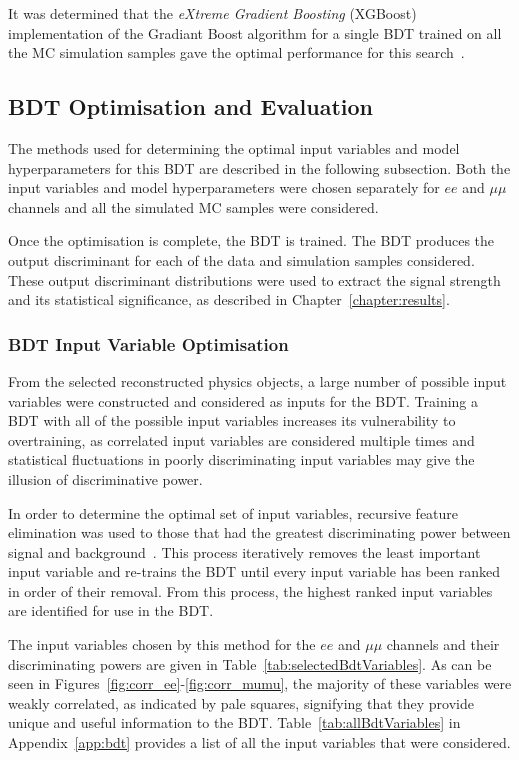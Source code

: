 It was determined that the \emph{eXtreme Gradient Boosting} (XGBoost) implementation of the Gradiant Boost algorithm for a single BDT trained on all the MC simulation samples gave the optimal performance for this search~\cite{xgboost}.

\subsection{BDT Optimisation and Evaluation}\label{subsec:bdtOpt}
The methods used for determining the optimal input variables and model hyperparameters for this BDT are described in the following subsection.
Both the input variables and model hyperparameters were chosen separately for $ee$ and $\mu\mu$ channels and all the simulated MC samples were considered.

Once the optimisation is complete, the BDT is trained.
The BDT produces the output discriminant for each of the data and simulation samples considered.
These output discriminant distributions were used to extract the signal strength and its statistical significance, as described in Chapter~\ref{chapter:results}.

\subsubsection*{BDT Input Variable Optimisation}
From the selected reconstructed physics objects, a large number of possible input variables were constructed and considered as inputs for the BDT.
Training a BDT with all of the possible input variables increases its vulnerability to overtraining, as correlated input variables are considered multiple times and statistical fluctuations in poorly discriminating input variables may give the illusion of discriminative power.

In order to determine the optimal set of input variables, recursive feature elimination was used to those that had the greatest discriminating power between signal and background~\cite{Guyon2002}.
This process iteratively removes the least important input variable and re-trains the BDT until every input variable has been ranked in order of their removal.
From this process, the highest ranked input variables are identified for use in the BDT.

The input variables chosen by this method for the $ee$ and $\mu\mu$ channels and their discriminating powers are given in Table~\ref{tab:selectedBdtVariables}.
As can be seen in Figures~\ref{fig:corr_ee}-\ref{fig:corr_mumu}, the majority of these variables were weakly correlated, as indicated by pale squares, signifying that they provide unique and useful information to the BDT.
Table~\ref{tab:allBdtVariables} in Appendix~\ref{app:bdt} provides a list of all the input variables that were considered.

